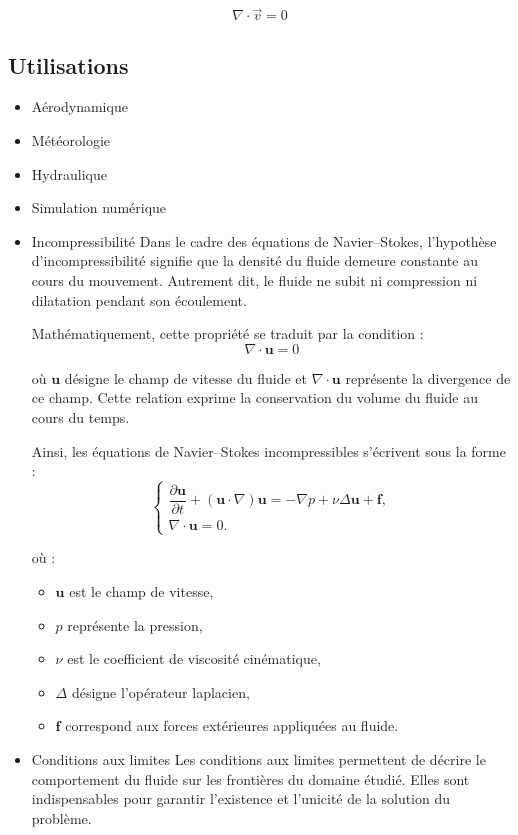 \documentclass[12pt,a4paper]{report}
\begin{document}
\begin{equation}
\nabla \cdot \vec{v} = 0
\end{equation}

\subsection*{Utilisations}

\begin{itemize}
    \item Aérodynamique
    \item Météorologie
    \item Hydraulique
    \item Simulation numérique
\end{itemize}



\begin{itemize}
    \item Incompressibilité
    Dans le cadre des équations de Navier--Stokes, l’hypothèse 
d’incompressibilité signifie que la densité du fluide demeure constante 
au cours du mouvement. Autrement dit, le fluide ne subit ni compression 
ni dilatation pendant son écoulement.

Mathématiquement, cette propriété se traduit par la condition :
\[
\nabla \cdot \mathbf{u} = 0
\]

où \(\mathbf{u}\) désigne le champ de vitesse du fluide et 
\(\nabla \cdot \mathbf{u}\) représente la divergence de ce champ. 
Cette relation exprime la conservation du volume du fluide au cours du temps.

Ainsi, les équations de Navier--Stokes incompressibles s’écrivent sous la forme :
\[
\begin{cases}
\dfrac{\partial \mathbf{u}}{\partial t}
+ (\mathbf{u}\cdot\nabla)\mathbf{u}
= -\nabla p + \nu \Delta \mathbf{u} + \mathbf{f}, \\
\nabla \cdot \mathbf{u} = 0.
\end{cases}
\]

où :
\begin{itemize}
    \item \(\mathbf{u}\) est le champ de vitesse,
    \item \(p\) représente la pression,
    \item \(\nu\) est le coefficient de viscosité cinématique,
    \item \(\Delta\) désigne l’opérateur laplacien,
    \item \(\mathbf{f}\) correspond aux forces extérieures appliquées au fluide.
\end{itemize}
    \item Conditions aux limites
     Les conditions aux limites 
permettent de décrire le comportement du fluide sur les frontières du domaine étudié. 
Elles sont indispensables pour garantir l’existence et l’unicité\textit{\textbf{}} de la solution du problème.


\end{itemize}
\end{document}
